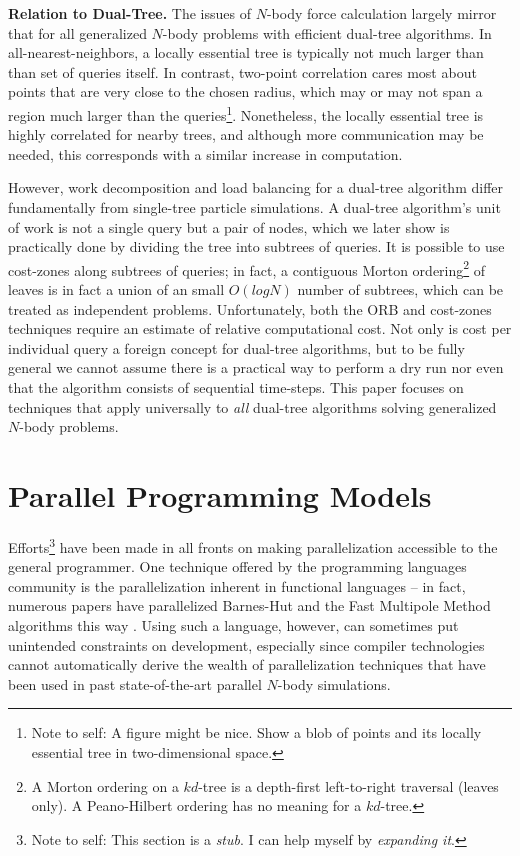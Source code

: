 \documentclass[times, leqno,twocolumn]{article}
\newcommand{\authornote}[1]{\footnote{Note to self: #1}}
\newcommand{\authorsnote}[1]{\authornote{#1}}
\begin{document}
{\bf Relation to Dual-Tree.}
The issues of $N$-body force calculation largely mirror that for all generalized $N$-body problems with efficient dual-tree algorithms.
In all-nearest-neighbors, a locally essential tree is typically not much larger than than set of queries itself.
In contrast, two-point correlation cares most about points that are very close to the chosen radius, which may or may not span a region much larger than the queries\authorsnote{A figure might be nice.  Show a blob of points and its locally essential tree in two-dimensional space.}.
Nonetheless, the locally essential tree is highly correlated for nearby trees, and although more communication may be needed, this corresponds with a similar increase in computation.

However, work decomposition and load balancing for a dual-tree algorithm differ fundamentally from single-tree particle simulations.
A dual-tree algorithm's unit of work is not a single query but a pair of nodes, which we later show is practically done by dividing the tree into subtrees of queries.
It is possible to use cost-zones along subtrees of queries; in fact, a contiguous Morton ordering\footnote{A Morton ordering on a $kd$-tree is a depth-first left-to-right traversal (leaves only).  A Peano-Hilbert ordering has no meaning for a $kd$-tree.} of leaves is in fact a union of an small $O(log N)$ number of subtrees, which can be treated as independent problems.
Unfortunately, both the ORB and cost-zones techniques require an estimate of relative computational cost.
Not only is cost per individual query a foreign concept for dual-tree algorithms, but to be fully general we cannot assume there is a practical way to perform a dry run nor even that the algorithm consists of sequential time-steps.
This paper focuses on techniques that apply universally to {\it all} dual-tree algorithms solving generalized $N$-body problems.

\section{Parallel Programming Models}

Efforts\authornote{This section is a {\it stub}. I can help myself by {\it expanding it}.} have been made in all fronts on making parallelization accessible to the general programmer.
One technique offered by the programming languages community is the parallelization inherent in functional languages -- in fact, numerous papers have parallelized Barnes-Hut and the Fast Multipole Method algorithms this way \cite{hu-implementing, more}.
Using such a language, however, can sometimes put unintended constraints on development, especially since compiler technologies cannot automatically derive the wealth of parallelization techniques that have been used in past state-of-the-art parallel $N$-body simulations.
\end{document}
